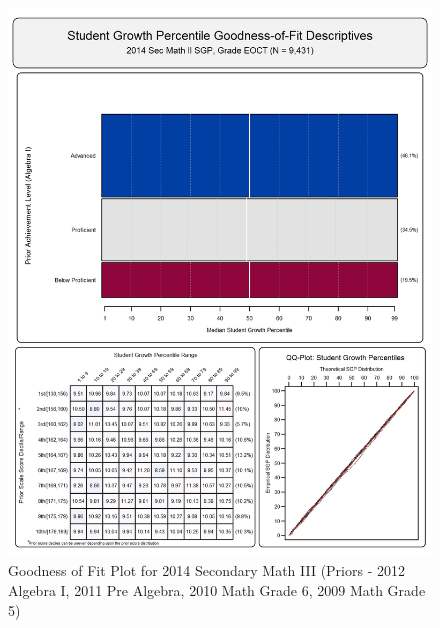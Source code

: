 \documentclass[12pt]{article}
\begin{document}
\begin{figure}[htbp]
\centering
\includegraphics{../img/Goodness_of_Fit/SEC_MATH_II.2014/2014_SEC_MATH_II_EOCT;2012_ALGEBRA_I_EOCT;2011_PRE_ALGEBRA_EOCT;2010_MATH_6;2009_MATH_5.png}
\caption{Goodness of Fit Plot for 2014 Secondary Math III (Priors - 2012
Algebra I, 2011 Pre Algebra, 2010 Math Grade 6, 2009 Math Grade 5)}
\end{figure}
\end{document}
